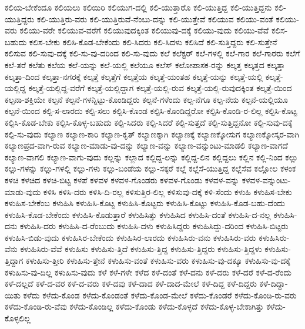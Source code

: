{ಕಲಿಯ-ಬೇಕೆಂದೂ
ಕಲಿಯಲು
ಕಲಿಯಿರಿ
ಕಲಿಯುಗ-ದಲ್ಲಿ
ಕಲಿ-ಯುತ್ತಾರೊ
ಕಲಿ-ಯುತ್ತಿದ್ದ
ಕಲಿ-ಯುತ್ತಿದ್ದನು
ಕಲಿ-ಯುತ್ತಿದ್ದರು
ಕಲಿ-ಯುತ್ತಿರು-ವರು
ಕಲಿ-ಯುತ್ತಿರುವೆ-ನೆಂಬು-ದನ್ನು
ಕಲಿ-ಯುತ್ತೇವೆ
ಕಲಿಯುವ
ಕಲಿಯು-ವಂತೆ
ಕಲಿಯು-ವರು
ಕಲಿಯು-ವರೇ
ಕಲಿಯುವ-ವರೆಗೆ
ಕಲಿಯುವುದಕ್ಕಿಂತ
ಕಲಿಯುವು-ದಕ್ಕೆ
ಕಲಿಯು-ವುದು
ಕಲಿಯು-ವೆವೆ
ಕಲಿಸ-ಬಹುದು
ಕಲಿಸ-ಬೇಕು
ಕಲಿಸಿ-ಕೊಡ-ಬೇಕೆಂದು
ಕಲಿ-ಸಿದರು
ಕಲಿ-ಸಿದಳು
ಕಲಿಸಿದೆ
ಕಲಿ-ಸುತ್ತಿದ್ದರು
ಕಲಿ-ಸುತ್ತೇನೆ
ಕಲಿಸುವ
ಕಲಿ-ಸುವು-ದಕ್ಕೆ
ಕಲಿ-ಸು-ವು-ದರಿಂದ
ಕಲಿ-ಸು-ವುದು
ಕಲೆ
ಕಲೆಕ್ಟರ್
ಕಲೆ-ಗಳಲ್ಲಿ
ಕಲೆ-ಗಾರ
ಕಲೆ-ಗಾರರು
ಕಲೆಗೆ
ಕಲೆ-ತರೆ
ಕಲೆತು
ಕಲೆಯ
ಕಲೆ-ಯನ್ನು
ಕಲೆ-ಯಲ್ಲಿ
ಕಲೆಯೂ
ಕಲೆಸ್
ಕಲೋಪಾಸಕ-ರನ್ನು
ಕಲ್ಕತ್ತ
ಕಲ್ಕತ್ತದ
ಕಲ್ಕತ್ತಾ
ಕಲ್ಕತ್ತಾ-ದಿಂದ
ಕಲ್ಕತ್ತಾ-ನಗರಕ್ಕೆ
ಕಲ್ಕತ್ತೆ
ಕಲ್ಕತ್ತೆಗೆ
ಕಲ್ಕತ್ತೆಯ
ಕಲ್ಕತ್ತೆ-ಯಂತಹ
ಕಲ್ಕತ್ತೆ-ಯನ್ನು
ಕಲ್ಕತ್ತೆ-ಯಲ್ಲಿ
ಕಲ್ಕತ್ತೆ-ಯಲ್ಲಿದ್ದ
ಕಲ್ಕತ್ತೆ-ಯಲ್ಲಿದ್ದ-ವರೆಗೆ
ಕಲ್ಕತ್ತೆ-ಯಲ್ಲಿದ್ದಾಗ
ಕಲ್ಕತ್ತೆ-ಯಲ್ಲಿ-ರುವ
ಕಲ್ಕತ್ತೆ-ಯಲ್ಲಿ-ರುವುದಕ್ಕಿಂತ
ಕಲ್ಕತ್ತೆ-ಯಿಂದ
ಕಲ್ಪನಾ-ಶಕ್ತಿಯೇ
ಕಲ್ಪನೆ
ಕಲ್ಪನೆ-ಗಳನ್ನಿಟ್ಟು-ಕೊಂಡಿದ್ದರು
ಕಲ್ಪನೆ-ಗಳೆಂದು
ಕಲ್ಪ-ನೆಗೂ
ಕಲ್ಪ-ನೆಯ
ಕಲ್ಪನೆ-ಯಲ್ಲಿಯೂ
ಕಲ್ಪನೆ-ಯಿಂದ
ಕಲ್ಪಿ-ಸ-ಲಾರದು
ಕಲ್ಪಿ-ಸಲು
ಕಲ್ಪಿಸಿ-ಕೊಂಡ
ಕಲ್ಪಿಸಿ-ಕೊಂಡಿದ್ದರೋ
ಕಲ್ಪಿಸಿ-ಕೊಂಡಿ-ರ-ಲಿಲ್ಲ
ಕಲ್ಪಿಸಿ-ಕೊಟ್ಟ
ಕಲ್ಪಿಸಿ-ಕೊಡ-ಬೇಕು
ಕಲ್ಪಿಸಿ-ಕೊಳ್ಳ-ಬಹುದು
ಕಲ್ಪಿ-ಸಿದರು
ಕಲ್ಪಿ-ಸಿದರೆ
ಕಲ್ಪಿ-ಸುತ್ತದೆ
ಕಲ್ಪಿ-ಸುತ್ತಿದ್ದನೋ
ಕಲ್ಪಿ-ಸುವು-ದಕ್ಕೆ
ಕಲ್ಪಿ-ಸು-ವುದು
ಕಲ್ಯಾಣ
ಕಲ್ಯಾಣ-ಕಾರಿ
ಕಲ್ಯಾಣ-ಕೃತ್
ಕಲ್ಯಾಣಕ್ಕಾಗಿ
ಕಲ್ಯಾಣಕ್ಕೆ
ಕಲ್ಯಾಣಕ್ಕೋಸುಗ
ಕಲ್ಯಾಣಕ್ಕೋಸ್ಕರ-ವಾಗಿ
ಕಲ್ಯಾಣಪ್ರದ-ವಾಗಿ-ರುವ
ಕಲ್ಯಾಣ-ಮಾಡು-ವು-ದನ್ನು
ಕಲ್ಯಾಣ-ವನ್ನು
ಕಲ್ಯಾಣ-ವನ್ನುಂಟು-ಮಾಡಲಿ
ಕಲ್ಯಾಣ-ವಾಗದೆ
ಕಲ್ಯಾಣ-ವಾಗಲಿ
ಕಲ್ಯಾಣ-ವಾಗು-ವುದು
ಕಲ್ಲನ್ನು
ಕಲ್ಲಾದ
ಕಲ್ಲಿದ್ದ-ಲನ್ನು
ಕಲ್ಲಿದ್ದ-ಲಿನ
ಕಲ್ಲಿದ್ದಲು
ಕಲ್ಲಿನ
ಕಲ್ಲಿ-ನಿಂದ
ಕಲ್ಲು
ಕಲ್ಲು-ಗಳನ್ನು
ಕಲ್ಲು-ಗಳಲ್ಲಿ
ಕಲ್ಲು-ಗಳು
ಕಲ್ಲು-ಬಂಡೆಯ
ಕಲ್ಲು-ಸಕ್ಕರೆ
ಕಲ್ಲೆ
ಕಲ್ಲೆಸೆ-ಯುತ್ತಿದ್ದ
ಕಲ್ಲೆಸೆವ
ಕಲ್ಲೋಲ
ಕಳಂಕ
ಕಳಚಿ
ಕಳಚಿದ
ಕಳಚಿ-ಬಿಟ್ಟ
ಕಳಪೆ
ಕಳವಳ
ಕಳವಳ-ಗೊಂಡರು
ಕಳವಳ-ಗೊಂಡು
ಕಳವಳ-ವನ್ನು
ಕಳವಳ-ವನ್ನುಂಟು-ಮಾಡು-ವುದು
ಕಳಿಸಿ
ಕಳಿಸಿ-ದರು
ಕಳಿಸಿ-ದಿ-ರಲ್ಲ
ಕಳಿಸುತ್ತಿರ-ಲಿಲ್ಲ
ಕಳಿಸುವು-ದಕ್ಕೆ
ಕಳಿ-ಸೆಂದು
ಕಳುಹಿ
ಕಳುಹಿಸ-ಬೇಕು
ಕಳುಹಿಸ-ಬೇಕೆಂಬ
ಕಳುಹಿಸಿ
ಕಳುಹಿಸಿ-ಕೊಟ್ಟ
ಕಳುಹಿಸಿ-ಕೊಟ್ಟರು
ಕಳುಹಿಸಿ-ಕೊಟ್ಟು
ಕಳುಹಿಸಿ-ಕೊಡ-ಬಹು-ದೆಂದು
ಕಳುಹಿಸಿ-ಕೊಡ-ಬೇಕೆಂದು
ಕಳುಹಿಸಿ-ಕೊಡುತ್ತಾರೆ
ಕಳುಹಿಸಿತ್ತು
ಕಳುಹಿಸಿದ
ಕಳುಹಿಸಿ-ದಂತೆ
ಕಳುಹಿಸಿ-ದ-ನಲ್ಲ
ಕಳುಹಿಸಿ-ದನು
ಕಳುಹಿಸಿ-ದರು
ಕಳುಹಿಸಿ-ದ-ರೆಂಬುದು
ಕಳುಹಿಸಿ-ದಳು
ಕಳುಹಿಸಿದ್ದರು
ಕಳುಹಿಸಿದ್ದು-ದರಿಂದ
ಕಳುಹಿಸಿ-ಬಿಟ್ಟರು
ಕಳುಹಿಸಿ-ಬಿಡು-ವುದು
ಕಳುಹಿಸಿರ-ಬೇಕೆಂದು
ಕಳುಹಿಸಿರ-ಲಾರದು
ಕಳುಹಿಸಿರು-ವನು
ಕಳುಹಿಸಿರು-ವರು
ಕಳುಹಿಸಿರು-ವೆನು
ಕಳುಹಿಸಿರು-ವೆವೆ
ಕಳುಹಿಸು
ಕಳುಹಿಸು-ತ್ತಿದೆ
ಕಳುಹಿಸು-ತ್ತಿದ್ದ
ಕಳುಹಿಸು-ತ್ತಿದ್ದರು
ಕಳುಹಿಸು-ತ್ತಿದ್ದಳು
ಕಳುಹಿಸು-ತ್ತಿದ್ದಾಗ
ಕಳುಹಿಸು-ತ್ತೀರಿ
ಕಳುಹಿಸು-ತ್ತೇನೆ
ಕಳುಹಿಸು-ವಂತೆ
ಕಳುಹಿಸು-ವರು
ಕಳುಹಿಸು-ವು-ದಕ್ಕೂ
ಕಳುಹಿಸು-ವು-ದಕ್ಕೆ
ಕಳುಹಿಸು-ವು-ದಿಲ್ಲ
ಕಳುಹಿಸು-ವುದು
ಕಳೆ
ಕಳೆ-ಗಳೇ
ಕಳೆದ
ಕಳೆ-ದಂತೆ
ಕಳೆ-ದನು
ಕಳೆ-ದರು
ಕಳೆ-ದರೆ
ಕಳೆ-ದ-ರೆಂದು
ಕಳೆ-ದಲ್ಲದೆ
ಕಳೆ-ದ-ವರ
ಕಳೆ-ದ-ವರು
ಕಳೆ-ದವು
ಕಳೆ-ದಾದ
ಕಳೆ-ದಾದ-ಮೇಲೆ
ಕಳೆ-ದಿದ್ದ
ಕಳೆ-ದಿದ್ದರು
ಕಳೆ-ದಿದ್ದಾ-ಯಿತು
ಕಳೆದು
ಕಳೆದು-ಕೊಂಡ
ಕಳೆದು-ಕೊಂಡಂತೆ
ಕಳೆದು-ಕೊಂಡ-ಮೇಲೆ
ಕಳೆದು-ಕೊಂಡರೆ
ಕಳೆದು-ಕೊಂಡಿ-ರು-ವರು
ಕಳೆದು-ಕೊಂಡಿ-ರು-ವೆವು
ಕಳೆದು-ಕೊಂಡಿಲ್ಲ
ಕಳೆದು-ಕೊಂಡು
ಕಳೆದು-ಕೊಳ್ಳದೆ
ಕಳೆದು-ಕೊಳ್ಳ-ಬೇಕಾಗಿತ್ತು
ಕಳೆದು-ಕೊಳ್ಳಲಿಲ್ಲ
}
